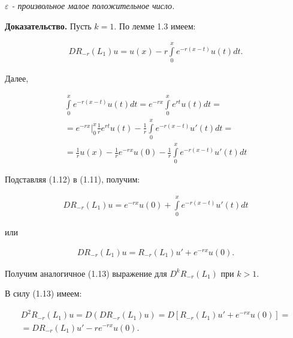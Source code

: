 \textit{ $ \varepsilon $ - произвольное малое положительное число.}

\textbf{Доказательство.} Пусть $ k = 1 $. По лемме 1.3 имеем:

\begin{equation}
\begin{array}{c}

DR_{-r}(L_1)u = u(x) - r\int\limits_0^x e^{-r(x-t)}u(t)dt.

\end{array}
\end{equation}

Далее,

\begin{equation}
\begin{array}{c}

\int\limits_0^x e^{-r(x-t)}u(t)dt = e^{-rx}\int\limits_0^x e^{rt}u(t)dt = \\
= e^{-rx} \big\vert_0^x \frac{1}{r} e^{rt}u(t) - \frac{1}{r}\int\limits_0^x e^{-r(x-t)}u'(t)dt = \\
= \frac{1}{r}u(x) - \frac{1}{r} e^{-rx}u(0) - \frac{1}{r}\int\limits_0^x e^{-r(x-t)}u'(t)dt

\end{array}
\end{equation}

Подставляя (1.12) в (1.11), получим:

\begin{equation}
\begin{array}{c}
\nonumber

DR_{-r}(L_1)u = e^{-rx}u(0) + \int\limits_0^x e^{-r(x-t)}u'(t)dt

\end{array}
\end{equation}

или

\begin{equation}
\begin{array}{c}

DR_{-r}(L_1)u = R_{-r}(L_1)u' + e^{-rx}u(0).

\end{array}
\end{equation}

Получим аналогичное (1.13) выражение для $ D^kR_{-r}(L_1) $ при $ k > 1 $. 

В силу (1.13) имеем:

\begin{equation}
\begin{array}{c}
\nonumber

D^2R_{-r}(L_1)u = D(DR_{-r}(L_1)u) = D[R_{-r}(L_1)u' + e^{-rx}u(0)] = \\
= DR_{-r}(L_1)u' - re^{-rx}u(0).

\end{array}
\end{equation}

